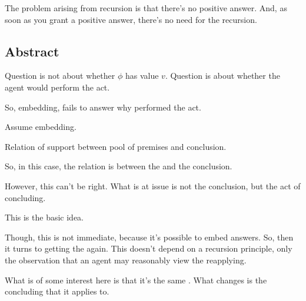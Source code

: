 \begin{note}
  The problem arising from recursion is that there's no positive answer.
  And, as soon as you grant a positive answer, there's no need for the recursion.
\end{note}

\newpage

\subsection{Abstract}
\label{cha:zSpAwhy:sec:argument:abstract}

\begin{note}
  \color{red}
  Question is not about whether \(\phi\) has value \(v\).
  Question is about whether the agent would perform the act.

  So, embedding, fails to answer why performed the act.

  Assume embedding.

  Relation of support between pool of premises and conclusion.

  So, in this case, the relation is between the \fc{} and the conclusion.

  However, this can't be right.
  What is at issue is not the conclusion, but the act of concluding.

  This is the basic idea.

  Though, this is not immediate, because it's possible to embed answers.
  So, then it turns to getting the \requ{} again.
  This doesn't depend on a recursion principle, only the observation that an agent may reasonably view the \requ{} reapplying.

  What is of some interest here is that it's the same \requ{}.
  What changes is the concluding  that it applies to.
\end{note}

